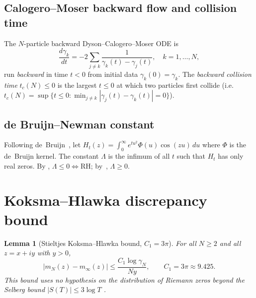 \documentclass[11pt,reqno]{amsart}
\newtheorem{lemma}[theorem]{Lemma}
\newcommand{\Lam}{\Lambda}
\newcommand{\tc}{t_c}
\newcommand{\mN}{m_N}
\newcommand{\minf}{m_\infty}
\newcommand{\gN}{\gamma_N}
\begin{document}
\subsection{Calogero--Moser backward flow and collision time}

The $N$-particle backward Dyson--Calogero--Moser ODE is
\begin{equation}
  \frac{d\gamma_k}{dt} = -2\sum_{j \neq k} \frac{1}{\gamma_k(t) - \gamma_j(t)},
  \quad k = 1,\ldots,N,
\end{equation}
run \emph{backward} in time $t < 0$ from initial data $\gamma_k(0) = \gamma_k$.
The \emph{backward collision time} $\tc(N) \leq 0$ is the largest $t \leq 0$
at which two particles first collide (i.e.\ $\tc(N) = \sup\{t \leq 0 : \min_{j\neq k}|\gamma_j(t)-\gamma_k(t)|=0\}$).

\subsection{de Bruijn--Newman constant}

Following de~Bruijn~\cite{debruijn50}, let
$H_t(z) = \int_0^\infty e^{tu^2} \Phi(u)\cos(zu)\,du$
where $\Phi$ is the de~Bruijn kernel.  The constant $\Lam$ is the infimum
of all $t$ such that $H_t$ has only real zeros.  By \cite{debruijn50},
$\Lam \leq 0 \Leftrightarrow \text{RH}$; by~\cite{rodgers-tao20},
$\Lam \geq 0$.

\section{Koksma--Hlawka discrepancy bound}\label{sec:kh}

\begin{lemma}[Stieltjes Koksma--Hlawka bound, $C_1 = 3\pi$]\label{lem:kh}
For all $N \geq 2$ and all $z = x + iy$ with $y > 0$,
\begin{equation}\label{eq:kh}
  |\mN(z) - \minf(z)| \leq \frac{C_1 \log \gN}{N y},
  \qquad C_1 = 3\pi \approx 9.425.
\end{equation}
This bound uses no hypothesis on the distribution of Riemann zeros beyond
the Selberg bound $|S(T)| \leq 3\log T$ \cite{titchmarsh86}.
\end{lemma}
\end{document}
